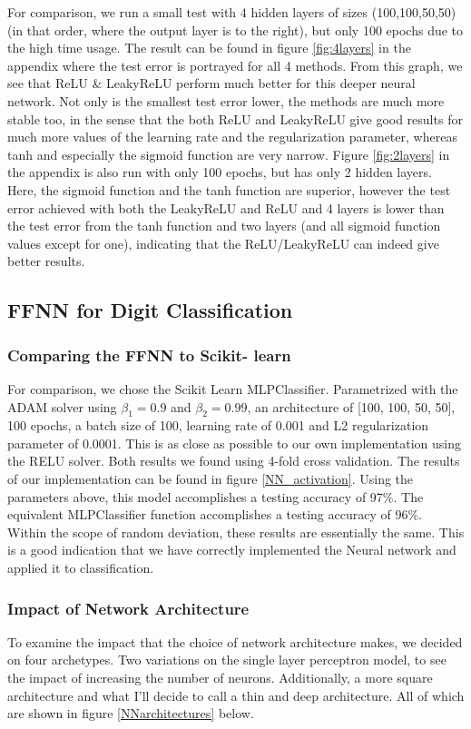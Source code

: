 \documentclass[11pt,a4paper,titlepage]{article}
\begin{document}
For comparison, we run a small test with 4 hidden layers of sizes (100,100,50,50) (in that order, where the output layer is to the right), but only 100 epochs due to the high time usage. The result can be found in figure \ref{fig:4layers} in the appendix where the test error is portrayed for all 4 methods. From this graph, we see that ReLU \& LeakyReLU perform much better for this deeper neural network. Not only is the smallest test error lower, the methods are much more stable too, in the sense that the both ReLU and LeakyReLU give good results for much more values of the learning rate and the regularization parameter, whereas tanh and especially the sigmoid function are very narrow. Figure \ref{fig:2layers} in the appendix is also run with only 100 epochs, but has only 2 hidden layers. Here, the sigmoid function and the tanh function are superior, however the test error achieved with both the LeakyReLU and ReLU and 4 layers is lower than the test error from the tanh function and two layers (and all sigmoid function values except for one), indicating that the ReLU/LeakyReLU can indeed give better results.


\subsection{FFNN for Digit Classification}
\subsubsection{Comparing the FFNN to Scikit- learn}
For comparison, we chose the Scikit Learn MLPClassifier. Parametrized with the ADAM solver using $\beta_1 = 0.9$ and $\beta_2 = 0.99$, an architecture of [100, 100, 50, 50], 100 epochs, a batch size of 100, learning rate of 0.001 and L2 regularization parameter of 0.0001. This is as close as possible to our own implementation using the RELU solver. Both results we found using 4-fold cross validation. The results of our implementation can be found in figure \ref{NN_activation}. Using the parameters above, this model accomplishes a testing accuracy of 97\%. The equivalent MLPClassifier function accomplishes a testing accuracy of 96\%. Within the scope of random deviation, these results are essentially the same. This is a good indication that we have correctly implemented the Neural network and applied it to classification.



\subsubsection{Impact of Network Architecture}
To examine the impact that the choice of network architecture makes, we decided on four archetypes. Two variations on the single layer perceptron model, to see the impact of increasing the number of neurons. Additionally, a more square architecture and what I'll decide to call a thin and deep architecture. All of which are shown in figure \ref{NNarchitectures} below.
\end{document}
